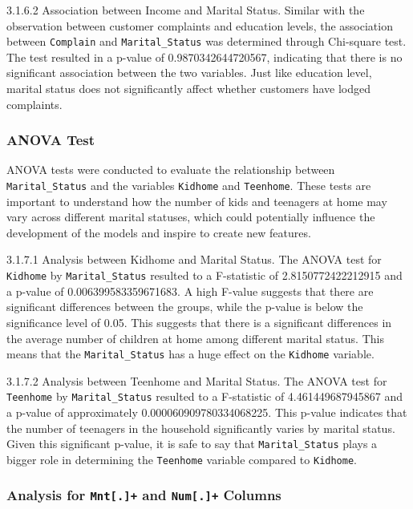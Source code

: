     3.1.6.2 Association between Income and Marital Status. Similar with the observation between customer complaints and education levels, the association between \texttt{Complain} and \texttt{Marital_Status} was determined through Chi-square test. The test resulted in a p-value of 0.9870342644720567, indicating that there is no significant association between the two variables. Just like education level, marital status does not significantly affect whether customers have lodged complaints.

\subsubsection{ANOVA Test}

ANOVA tests were conducted to evaluate the relationship between \texttt{Marital_Status} and the variables \texttt{Kidhome} and \texttt{Teenhome}. These tests are important to understand how the number of kids and teenagers at home may vary across different marital statuses, which could potentially influence the development of the models and inspire to create new features.

    3.1.7.1 Analysis between Kidhome and Marital Status. The ANOVA test for \texttt{Kidhome} by \texttt{Marital_Status} resulted to a F-statistic of 2.8150772422212915 and a p-value of 0.006399583359671683. A high F-value suggests that there are significant differences between the groups, while the p-value is below the significance level of 0.05. This suggests that there is a significant differences in the average number of children at home among different marital status. This means that the \texttt{Marital_Status} has a huge effect on the \texttt{Kidhome} variable.

    3.1.7.2 Analysis between Teenhome and Marital Status. The ANOVA test for \texttt{Teenhome} by \texttt{Marital_Status} resulted to a F-statistic of 4.461449687945867 and a p-value of approximately 0.000060909780334068225. This p-value indicates that the number of teenagers in the household significantly varies by marital status. Given this significant p-value, it is safe to say that \texttt{Marital_Status} plays a bigger role in determining the \texttt{Teenhome} variable compared to \texttt{Kidhome}. 

\subsubsection{Analysis for \texttt{Mnt[.]+} and \texttt{Num[.]+} Columns}

